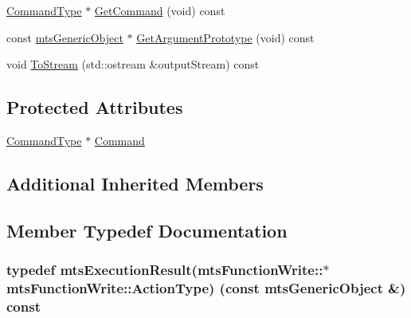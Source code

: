 \begin{DoxyCompactItemize}
\item 
\hyperlink{classmts_function_write_a4b81286be87adec18b358ebaa9ebb2be}{Command\+Type} $\ast$ \hyperlink{classmts_function_write_ad8f4d561ea927be81b0bfe73f1d360eb}{Get\+Command} (void) const 
\item 
const \hyperlink{classmts_generic_object}{mts\+Generic\+Object} $\ast$ \hyperlink{classmts_function_write_ab3d6c6e2a28441d5cf0eb2ecd6ff8140}{Get\+Argument\+Prototype} (void) const 
\item 
void \hyperlink{classmts_function_write_a3e7e0298146311a8adae45c0441891b7}{To\+Stream} (std\+::ostream \&output\+Stream) const 
\end{DoxyCompactItemize}
\subsection*{Protected Attributes}
\begin{DoxyCompactItemize}
\item 
\hyperlink{classmts_function_write_a4b81286be87adec18b358ebaa9ebb2be}{Command\+Type} $\ast$ \hyperlink{classmts_function_write_ac457eca9ee4e0f8bfc4b2c8a9b3a7927}{Command}
\end{DoxyCompactItemize}
\subsection*{Additional Inherited Members}


\subsection{Member Typedef Documentation}
\hypertarget{classmts_function_write_acdce6b414e90dfb8c05bab5e7a2db81b}{}
\subsubsection[{Action\+Type}]{\setlength{\rightskip}{0pt plus 5cm}typedef mts\+Execution\+Result(mts\+Function\+Write\+::$\ast$ mts\+Function\+Write\+::\+Action\+Type) (const {\bf mts\+Generic\+Object} \&) const }\label{classmts_function_write_acdce6b414e90dfb8c05bab5e7a2db81b}
\hypertarget{classmts_function_write_a4b81286be87adec18b358ebaa9ebb2be}{}
